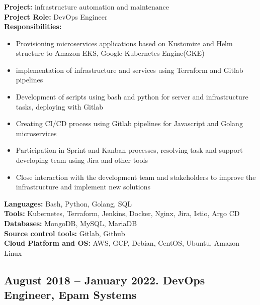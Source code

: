 \documentclass[letterpaper]{article}
\begin{document}
\subsubsection{}
\label{sec-2-1-1}
\textbf{Project:} infrastructure automation and maintenance\\
\textbf{Project Role:}  DevOps Engineer\\
\textbf{Responsibilities:}\\
\begin{itemize}
	\item Provisioning microservices applications based on Kustomize and Helm structure to Amazon EKS, Google Kubernetes Engine(GKE)
	\item implementation of infrastructure and services using Terraform and Gitlab pipelines
	\item Development of scripts using bash and python for server and infrastructure tasks, deploying with Gitlab
	\item Creating CI/CD process using Gitlab pipelines for Javascript and Golang microservices
	\item Participation in Sprint and Kanban processes, resolving task and support developing team using Jira and other tools
	\item Close interaction with the development team and stakeholders to improve the infrastructure and implement new solutions
\end{itemize}
\textbf{Languages:} Bash, Python, Golang, SQL\\
\textbf{Tools:} Kubernetes, Terraform, Jenkins, Docker, Nginx, Jira, Istio, Argo CD \\
\textbf{Databases:} MongoDB, MySQL, MariaDB\\
\textbf{Source control tools:} Gitlab, Github\\
\textbf{Cloud Platform and OS:} AWS, GCP, Debian, CentOS, Ubuntu, Amazon Linux \\
\subsection{{August 2018 – January 2022}. DevOps Engineer, Epam Systems}
\label{sec-2-1}
\end{document}
